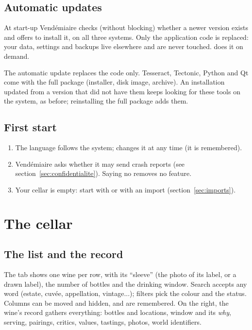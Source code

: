 \documentclass[11pt,a4paper]{article}
\begin{document}
\subsection{Automatic updates}
At start-up Vendémiaire checks (without blocking) whether a newer version exists and offers to install it,
on all three systems. Only the application code is replaced: your data, settings and backups live elsewhere
and are never touched.  does it on demand.
\begin{attention}
The automatic update replaces the code only. Tesseract, Tectonic, Python and Qt come with the full package
(installer, disk image, archive). An installation updated from a version that did not have them keeps
looking for these tools on the system, as before; reinstalling the full package adds them.
\end{attention}

\subsection{First start}
\begin{enumerate}
  \item The language follows the system;  changes it at any time (it is remembered).
  \item Vendémiaire asks whether it may send crash reports (see section~\ref{sec:confidentialite}). Saying
        no removes no feature.
  \item Your cellar is empty: start with  or with an import
        (section~\ref{sec:imports}).
\end{enumerate}

\section{The cellar}

\subsection{The list and the record}
The  tab shows one wine per row, with its ``sleeve'' (the photo of its label, or a drawn
label), the number of bottles and the drinking window. Search accepts any word (estate, cuvée, appellation,
vintage...); filters pick the colour and the status. Columns can be moved and hidden, and are remembered.
On the right, the wine's record gathers everything: bottles and locations, window and its \emph{why},
serving, pairings, critics, values, tastings, photos, world identifiers.
\end{document}
